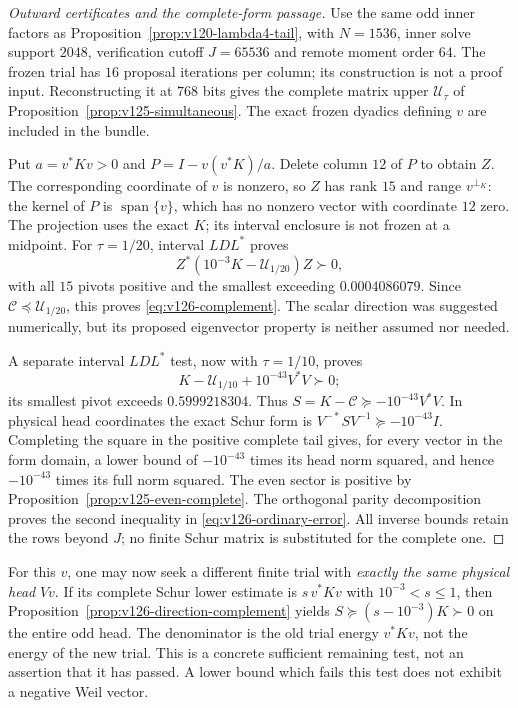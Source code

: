 \begin{proof}[Outward certificates and the complete-form passage]
Use the same odd inner factors as
Proposition~\ref{prop:v120-lambda4-tail}, with $N=1536$,
inner solve support $2048$, verification cutoff $J=65536$ and
remote moment order $64$.  The frozen trial has $16$ proposal
iterations per column; its construction is not a proof input.
Reconstructing it at $768$ bits gives the complete matrix upper
$\mathcal U_\tau$ of Proposition~\ref{prop:v125-simultaneous}.
The exact frozen dyadics defining $v$ are included in the bundle.

Put $a=v^*Kv>0$ and $P=I-v(v^*K)/a$.  Delete column $12$ of
$P$ to obtain $Z$.  The corresponding coordinate of $v$ is nonzero,
so $Z$ has rank $15$ and range $v^{\perp_K}$: the kernel of $P$
is $\operatorname{span}\{v\}$, which has no nonzero vector
with coordinate $12$ zero.  The projection uses the exact $K$;
its interval enclosure is not frozen at a midpoint.  For
$\tau=1/20$, interval $LDL^*$ proves
\[
 Z^*(10^{-3}K-\mathcal U_{1/20})Z\succ0,
\]
with all $15$ pivots positive and the smallest exceeding
$0.0004086079$.  Since $\mathcal C\preceq\mathcal U_{1/20}$,
this proves \eqref{eq:v126-complement}.  The scalar direction
was suggested numerically, but its proposed eigenvector property
is neither assumed nor needed.

A separate interval $LDL^*$ test, now with $\tau=1/10$, proves
\[
 K-\mathcal U_{1/10}+10^{-43}V^*V\succ0;
\]
its smallest pivot exceeds $0.5999218304$.  Thus
$S=K-\mathcal C\succeq-10^{-43}V^*V$.
In physical head coordinates the exact Schur form is
$V^{-*}SV^{-1}\succeq-10^{-43}I$.  Completing the square
in the positive complete tail gives, for every vector in the form
domain, a lower bound of $-10^{-43}$ times its head norm squared,
and hence $-10^{-43}$ times its full norm squared.  The even
sector is positive by Proposition~\ref{prop:v125-even-complete}.
The orthogonal parity decomposition proves the second inequality
in \eqref{eq:v126-ordinary-error}.  All inverse bounds retain the
rows beyond $J$; no finite Schur matrix is substituted for the
complete one.
\end{proof}

For this $v$, one may now seek a different finite trial with
\emph{exactly the same physical head} $Vv$.  If its complete Schur
lower estimate is $s\,v^*Kv$ with $10^{-3}<s\le1$, then
Proposition~\ref{prop:v126-direction-complement} yields
$S\succeq(s-10^{-3})K\succ0$ on the entire odd head.
The denominator is the old trial energy $v^*Kv$, not the energy
of the new trial.  This is a concrete sufficient remaining test,
not an assertion that it has passed.  A lower bound which fails
this test does not exhibit a negative Weil vector.

